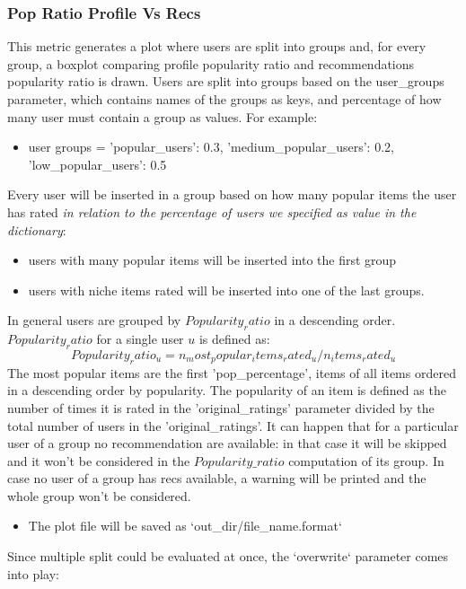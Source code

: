 \documentclass[11pt]{article}
\begin{document}
\subsubsection{Pop Ratio Profile Vs Recs}\label{sec:popRatio}
This metric generates a plot where users are split into groups and, for every group, a boxplot comparing
profile popularity ratio and recommendations popularity ratio is drawn.
Users are split into groups based on the user_groups parameter, which contains names of the groups as keys,
and percentage of how many user must contain a group as values. For example:
\begin{itemize}
       \item user groups = {'popular_users': 0.3, 'medium_popular_users': 0.2, 'low_popular_users': 0.5}
\end{itemize}
\hfill\break
\hfill\break
Every user will be inserted in a group based on how many popular items the user has rated
\textit{in relation to the percentage of users we specified as value in the dictionary}:
\begin{itemize}
    \item users with many popular items will be inserted into the first group
    \item users with niche items rated will be inserted into one of the last groups.
\end{itemize}
\hfill\break
\hfill\break
In general users are grouped by $Popularity_ratio$ in a descending order. $Popularity_ratio$ for a single user $u$
is defined as:
\hfill\break
\hfill\break
    \[
        Popularity_ratio_u = n_most_popular_items_rated_u / n_items_rated_u
    \]
\hfill\break
\hfill\break
The most popular items are the first 'pop_percentage', items of all items ordered in a descending order by
popularity.
The popularity of an item is defined as the number of times it is rated in the 'original_ratings' parameter
divided by the total number of users in the 'original_ratings'.
It can happen that for a particular user of a group no recommendation are available: in that case it will be skipped
and it won't be considered in the $Popularity\_ratio$ computation of its group. In case no user of a group has recs
available, a warning will be printed and the whole group won't be considered.
\begin{itemize}
    \item The plot file will be saved as `out\_dir/file\_name.format`
\end{itemize}
\hfill\break
\hfill\break
Since multiple split could be evaluated at once, the `overwrite` parameter comes into play:
\end{document}
